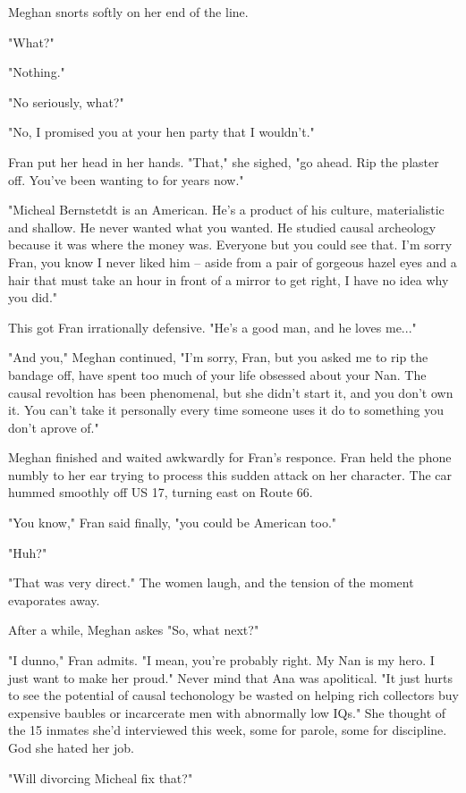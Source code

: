 \documentclass{article}
\begin{document}
Meghan snorts softly on her end of the line. 

"What?"

"Nothing."

"No seriously, what?"

"No, I promised you at your hen party that I wouldn't." 

Fran put her head in her hands. "That," she sighed, "go ahead. Rip the plaster off. You've been wanting to for years now."

"Micheal Bernstetdt is an American. He's a product of his culture, materialistic and shallow. He never wanted what you wanted. He studied causal archeology because it was where the money was. Everyone but you could see that. I'm sorry Fran, you know I never liked him -- aside from a pair of gorgeous hazel eyes and a hair that must take an hour in front of a mirror to get right, I have no idea why you did."

This got Fran irrationally defensive. "He's a good man, and he loves me..."

"And you," Meghan continued, "I'm sorry, Fran, but you asked me to rip the bandage off, have spent too much of your life obsessed about your Nan. The causal revoltion has been phenomenal, but she didn't start it, and you don't own it. You can't take it personally every time someone uses it do to something you don't aprove of." 

Meghan finished and waited awkwardly for Fran's responce. Fran held the phone numbly to her ear trying to process this sudden attack on her character. The car hummed smoothly off US 17, turning east on Route 66.

"You know," Fran said finally, "you could be American too."

"Huh?"

"That was very direct." The women laugh, and the tension of the moment evaporates away. 

After a while, Meghan askes "So, what next?"

"I dunno," Fran admits. "I mean, you're probably right. My Nan is my hero. I just want to make her proud." Never mind that Ana was apolitical. "It just hurts to see the potential of causal techonology be wasted on helping rich collectors buy expensive baubles or incarcerate men with abnormally low IQs." She thought of the 15 inmates she'd interviewed this week, some for parole, some for discipline. God she hated her job.

"Will divorcing Micheal fix that?"
\end{document}
